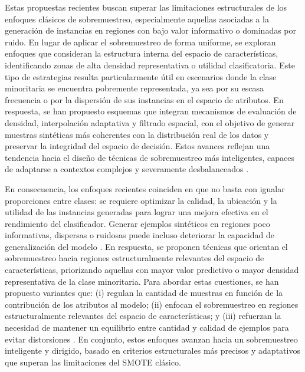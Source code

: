 \documentclass[12pt,a4paper]{article}
\begin{document}
Estas propuestas recientes buscan superar las limitaciones estructurales de los enfoques clásicos de sobremuestreo, especialmente aquellas asociadas a la generación de instancias en regiones con bajo valor informativo o dominadas por ruido. En lugar de aplicar el sobremuestreo de forma uniforme, se exploran enfoques que consideran la estructura interna del espacio de características, identificando zonas de alta densidad representativa o utilidad clasificatoria. Este tipo de estrategias resulta particularmente útil en escenarios donde la clase minoritaria se encuentra pobremente representada, ya sea por su escasa frecuencia o por la dispersión de sus instancias en el espacio de atributos. En respuesta, se han propuesto esquemas que integran mecanismos de evaluación de densidad, interpolación adaptativa y filtrado espacial, con el objetivo de generar muestras sintéticas más coherentes con la distribución real de los datos y preservar la integridad del espacio de decisión. Estos avances reflejan una tendencia hacia el diseño de técnicas de sobremuestreo más inteligentes, capaces de adaptarse a contextos complejos y severamente desbalanceados \parencite{qiu2025vs, lyu2025ld, nasaruddin2025smote}.

En consecuencia, los enfoques recientes coinciden en que no basta con igualar proporciones entre clases: se requiere optimizar la calidad, la ubicación y la utilidad de las instancias generadas para lograr una mejora efectiva en el rendimiento del clasificador. Generar ejemplos sintéticos en regiones poco informativas, dispersas o ruidosas puede incluso deteriorar la capacidad de generalización del modelo \parencite{lyu2025ld, qiu2025vs}. En respuesta, se proponen técnicas que orientan el sobremuestreo hacia regiones estructuralmente relevantes del espacio de características, priorizando aquellas con mayor valor predictivo o mayor densidad representativa de la clase minoritaria. Para abordar estas cuestiones, se han propuesto variantes que: (i) regulan la cantidad de muestras en función de la contribución de los atributos al modelo; (ii) enfocan el sobremuestreo en regiones estructuralmente relevantes del espacio de características; y (iii) refuerzan la necesidad de mantener un equilibrio entre cantidad y calidad de ejemplos para evitar distorsiones \parencite{lyu2025ld, qiu2025vs, nasaruddin2025smote}. En conjunto, estos enfoques avanzan hacia un sobremuestreo inteligente y dirigido, basado en criterios estructurales más precisos y adaptativos que superan las limitaciones del SMOTE clásico.
\end{document}
